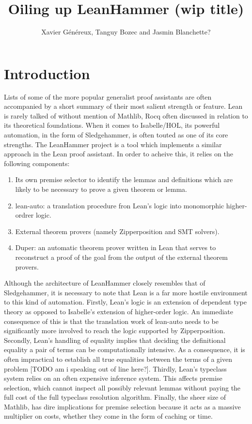 \documentclass[runningheads]{llncs}
\author{Xavier G\'{e}n\'{e}reux, Tanguy Bozec and Jasmin Blanchette?}
\title{Oiling up LeanHammer (wip title)}
\institute{Ludwig-Maximilian-Universit\"{a}t, M\"{u}nchen, Bayern}
\begin{document}
\maketitle
{}


\section{Introduction}
Lists of some of the more popular generalist proof assistants are often accompanied by a short summary of their most salient strength or feature. Lean is rarely talked of without mention of Mathlib, Rocq often discussed in relation to its theoretical foundations. When it comes to Isabelle/HOL, its powerful automation, in the form of Sledgehammer, is often touted as one of its core strengths. The LeanHammer project is a tool which implements a similar approach in the Lean proof assistant. In order to acheive this, it relies on the following components:
\begin{enumerate}
   \item Its own premise selector to identify the lemmas and definitions which are likely to be necessary to prove a given theorem or lemma.
   \item lean-auto: a translation procedure fron Lean's logic into monomorphic higher-ordrer logic.
   \item External theorem provers (namely Zipperposition and SMT solvers).
   \item Duper: an automatic theorem prover written in Lean that serves to reconstruct a proof of the goal from the output of the external theorem provers.
\end{enumerate}

Although the architecture of LeanHammer closely resembles that of Sledgehammer, it is necessary to note that Lean is a far more hostile environment to this kind of automation. 
Firstly, Lean's logic is an extension of dependent type theory as opposed to Isabelle's extension of higher-order logic. An immediate consequence of this is that the translation work of lean-auto needs to be significantly more involved to reach the logic supported by Zipperposition.
Secondly, Lean's handling of equality implies that deciding the definitional equality a pair of terms can be computationally intensive. As a consequence, it is often impractical to establish all true equalities between the terms of a given problem [TODO am i speaking out of line here?].
Thirdly, Lean's typeclass system relies on an often expensive inference system. This affects premise selection, which cannot inspect all possibly relevant lemmas without paying the full cost of the full typeclass resolution algorithm.
Finally, the sheer size of Mathlib, has dire implications for premise selection because it acts as a massive multiplier on costs, whether they come in the form of caching or time.
\end{document}
